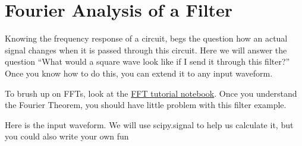 \documentclass[11pt]{article}
\begin{document}
    \section{Fourier Analysis of a
Filter}\label{fourier-analysis-of-a-filter}

Knowing the frequency response of a circuit, begs the question how an
actual signal changes when it is passed through this circuit. Here we
will answer the question ``What would a square wave look like if I send
it through this filter?'' Once you know how to do this, you can extend
it to any input waveform.

To brush up on FFTs, look at the
\href{https://github.com/mholtrop/Phys605/blob/master/Python/FFT/FFT\%2Bexample1.ipynb}{FFT
tutorial notebook}. Once you understand the Fourier Theorem, you should
have little problem with this filter example.

Here is the input waveform. We will use scipy.signal to help us
calculate it, but you could also write your own fun
\end{document}
